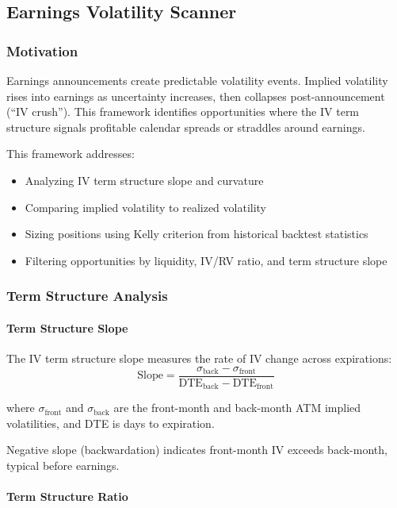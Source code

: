 \subsection{Earnings Volatility Scanner}

\subsubsection{Motivation}

Earnings announcements create predictable volatility events. Implied volatility rises into earnings as uncertainty increases, then collapses post-announcement (``IV crush''). This framework identifies opportunities where the IV term structure signals profitable calendar spreads or straddles around earnings.

This framework addresses:
\begin{itemize}
  \item Analyzing IV term structure slope and curvature
  \item Comparing implied volatility to realized volatility
  \item Sizing positions using Kelly criterion from historical backtest statistics
  \item Filtering opportunities by liquidity, IV/RV ratio, and term structure slope
\end{itemize}

\subsubsection{Term Structure Analysis}

\paragraph{Term Structure Slope}

The IV term structure slope measures the rate of IV change across expirations:
\[
\text{Slope} = \frac{\sigma_{\text{back}} - \sigma_{\text{front}}}{\text{DTE}_{\text{back}} - \text{DTE}_{\text{front}}}
\]

where $\sigma_{\text{front}}$ and $\sigma_{\text{back}}$ are the front-month and back-month ATM implied volatilities, and DTE is days to expiration.

Negative slope (backwardation) indicates front-month IV exceeds back-month, typical before earnings.

\paragraph{Term Structure Ratio}


